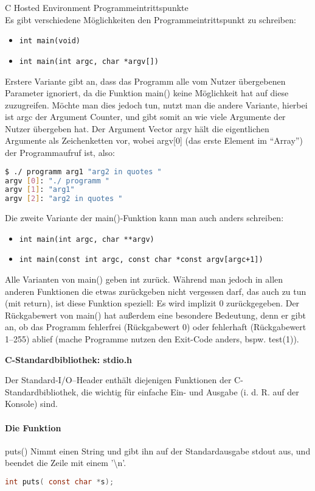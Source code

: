 \documentclass[paper=a4,fontsize=11pt]{scrartcl}%
\numberwithin{equation}{section}
\begin{document}
\Large{C Hosted Environment}
Programmeintrittspunkte\\
Es gibt verschiedene Möglichkeiten den Programmeintrittspunkt zu schreiben:
\begin{itemize}
	\item \texttt{int main(void)}
	\item \texttt{int main(int argc, char *argv[])}
\end{itemize}
	Erstere Variante gibt an, dass das Programm alle vom Nutzer übergebenen Parameter ignoriert, da die Funktion main() keine Möglichkeit hat auf diese zuzugreifen. Möchte man dies jedoch tun, nutzt man die andere Variante, hierbei ist argc der Argument Counter, und gibt somit an wie viele Argumente der Nutzer übergeben hat. Der Argument Vector argv hält die eigentlichen Argumente als Zeichenketten vor, wobei argv[0] (das erste Element im \enquote{Array}) der Programmaufruf ist, also:
	\begin{lstlisting}[style=Bash, language=Bash]
$ ./ programm arg1 "arg2 in quotes "
argv [0]: "./ programm "
argv [1]: "arg1"
argv [2]: "arg2 in quotes "
\end{lstlisting}

Die zweite Variante der main()-Funktion kann man auch anders schreiben:
\begin{itemize}
	\item \texttt{int main(int argc, char **argv)}
	\item \texttt{int main(const int argc, const char *const argv[argc+1])}
\end{itemize}
Alle Varianten von main() geben int zurück. Während man jedoch in allen anderen Funktionen die etwas zurückgeben nicht vergessen darf, das auch zu tun (mit return), ist diese Funktion speziell: Es wird implizit 0 zurückgegeben. Der Rückgabewert von main() hat außerdem eine besondere Bedeutung, denn er gibt an, ob das Programm fehlerfrei (Rückgabewert 0) oder fehlerhaft (Rückgabewert 1–255) ablief (mache Programme nutzen den Exit-Code anders, bspw. test(1)).

\textbf{C-Standardbibliothek: stdio.h}

Der Standard-I/O–Header enthält diejenigen Funktionen der C-Standardbibliothek, die wichtig
für einfache Ein- und Ausgabe (i. d. R. auf der Konsole) sind.
\paragraph{Die Funktion} puts() Nimmt einen String und gibt ihn auf der Standardausgabe stdout
aus, und beendet die Zeile mit einem '\textbackslash n'.
\begin{lstlisting}[language=C]
int puts( const char *s);
\end{lstlisting}
\end{document}

